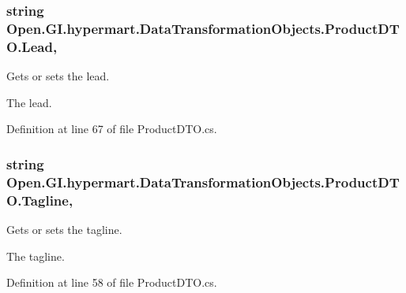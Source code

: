 \subsubsection[{Lead}]{\setlength{\rightskip}{0pt plus 5cm}string Open.\+G\+I.\+hypermart.\+Data\+Transformation\+Objects.\+Product\+D\+T\+O.\+Lead\hspace{0.3cm}{\ttfamily [get]}, {\ttfamily [set]}}\label{class_open_1_1_g_i_1_1hypermart_1_1_data_transformation_objects_1_1_product_d_t_o_a900af3a5017cf99ef7a51c8a496289cc}


Gets or sets the lead. 

The lead. 

Definition at line 67 of file Product\+D\+T\+O.\+cs.

\hypertarget{class_open_1_1_g_i_1_1hypermart_1_1_data_transformation_objects_1_1_product_d_t_o_a7b9cf190d3a304a72287dc1c0200aa94}{}
\subsubsection[{Tagline}]{\setlength{\rightskip}{0pt plus 5cm}string Open.\+G\+I.\+hypermart.\+Data\+Transformation\+Objects.\+Product\+D\+T\+O.\+Tagline\hspace{0.3cm}{\ttfamily [get]}, {\ttfamily [set]}}\label{class_open_1_1_g_i_1_1hypermart_1_1_data_transformation_objects_1_1_product_d_t_o_a7b9cf190d3a304a72287dc1c0200aa94}


Gets or sets the tagline. 

The tagline. 

Definition at line 58 of file Product\+D\+T\+O.\+cs.

\hypertarget{class_open_1_1_g_i_1_1hypermart_1_1_data_transformation_objects_1_1_product_d_t_o_a6f03b28697c295061d5c914d5598efef}{}
